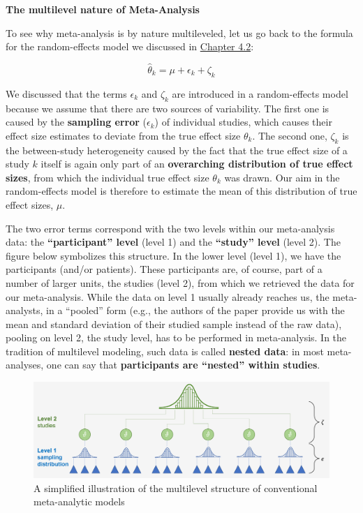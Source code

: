 \documentclass[]{book}
\begin{document}
\begin{rmdinfo}
\textbf{The multilevel nature of Meta-Analysis}

To see why meta-analysis is by nature multileveled, let us go back to
the formula for the random-effects model we discussed in
\protect\hyperlink{random}{Chapter 4.2}:

\[\hat\theta_k = \mu + \epsilon_k + \zeta_k\]

We discussed that the terms \(\epsilon_k\) and \(\zeta_k\) are
introduced in a random-effects model because we assume that there are
two sources of variability. The first one is caused by the
\textbf{sampling error} (\(\epsilon_k\)) of individual studies, which
causes their effect size estimates to deviate from the true effect size
\(\theta_k\). The second one, \(\zeta_k\) is the between-study
heterogeneity caused by the fact that the true effect size of a study
\(k\) itself is again only part of an \textbf{overarching distribution
of true effect sizes}, from which the individual true effect size
\(\theta_k\) was drawn. Our aim in the random-effects model is therefore
to estimate the mean of this distribution of true effect sizes, \(\mu\).

The two error terms correspond with the two levels within our
meta-analysis data: the \textbf{``participant'' level} (level 1) and the
\textbf{``study'' level} (level 2). The figure below symbolizes this
structure. In the lower level (level 1), we have the participants
(and/or patients). These participants are, of course, part of a number
of larger units, the studies (level 2), from which we retrieved the data
for our meta-analysis. While the data on level 1 usually already reaches
us, the meta-analysts, in a ``pooled'' form (e.g., the authors of the
paper provide us with the mean and standard deviation of their studied
sample instead of the raw data), pooling on level 2, the study level,
has to be performed in meta-analysis. In the tradition of multilevel
modeling, such data is called \textbf{nested data}: in most
meta-analyses, one can say that \textbf{participants are ``nested''
within studies}.

\begin{figure}
\centering
\includegraphics{multilevel-model.png}
\caption{A simplified illustration of the multilevel structure of
conventional meta-analytic models}
\end{figure}


\end{rmdinfo}
\end{document}
